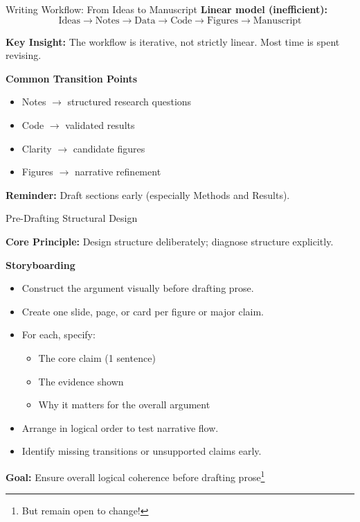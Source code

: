 \documentclass{beamer}
\begin{document}
\begin{frame}{Writing Workflow: From Ideas to Manuscript}
\textbf{Linear model (inefficient):}
\[
\text{Ideas} \rightarrow \text{Notes} \rightarrow \text{Data} \rightarrow \text{Code} \rightarrow \text{Figures} \rightarrow \text{Manuscript}
\]

\vspace{0.5em}
\begin{block}
    {\textbf{Key Insight:} The workflow is iterative, not strictly linear.}
    Most time is spent revising.
\end{block}
\vspace{0.5em}

\textbf{Common Transition Points}
\begin{itemize}
    \item Notes $\rightarrow$ structured research questions
    \item Code $\rightarrow$ validated results
    \item Clarity $\rightarrow$ candidate figures
    \item Figures $\rightarrow$ narrative refinement
\end{itemize}

\begin{block}{\textbf{Reminder:}}
    Draft sections early (especially Methods and Results).
\end{block}

\end{frame}


\begin{frame}{Pre-Drafting Structural Design}

\begin{block}{\textbf{Core Principle:}}
    Design structure deliberately; diagnose structure explicitly.
\end{block}

\textbf{Storyboarding}
\begin{itemize}
    \item Construct the argument visually before drafting prose.
    \item Create one slide, page, or card per figure or major claim.
    \item For each, specify:
    \begin{itemize}
        \item The core claim (1 sentence)
        \item The evidence shown
        \item Why it matters for the overall argument
    \end{itemize}
    \item Arrange in logical order to test narrative flow.
    \item Identify missing transitions or unsupported claims early.
\end{itemize}

\textbf{Goal:}
Ensure overall logical coherence before drafting prose\footnote{But remain open to change!}

\end{frame}
\end{document}
